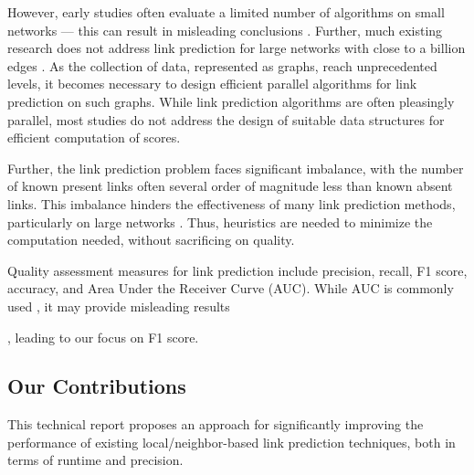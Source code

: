 However, early studies often evaluate a limited number of algorithms on small networks --- this can result in misleading conclusions \cite{zhou2021progresses, zhou2021experimental}. Further, much existing research does not address link prediction for large networks with close to a billion edges \cite{muscoloni2022adaptive, mumin2022efficient, nasiri2021novel, xian2021towards, ghasemian2020stacking, mara2020benchmarking, wang2019link, xu2019distributed, mohan2017scalable, cui2016bounded, garcia2014link, papadimitriou2012fast}. As the collection of data, represented as graphs, reach unprecedented levels, it becomes necessary to design efficient parallel algorithms for link prediction on such graphs. While link prediction algorithms are often pleasingly parallel, most studies do not address the design of suitable data structures for efficient computation of scores.

Further, the link prediction problem faces significant imbalance, with the number of known present links often several order of magnitude less than known absent links. This imbalance hinders the effectiveness of many link prediction methods, particularly on large networks \cite{wang2014link, garcia2014link}. Thus, heuristics are needed to minimize the computation needed, without sacrificing on quality. Quality assessment measures for link prediction include precision, recall, F1 score, accuracy, and Area Under the Receiver Curve (AUC). While AUC is commonly used \cite{arrar2023comprehensive}, it may provide misleading results \cite{yang2015evaluating, lichtnwalter2012link}, leading to our focus on F1 score.





\subsection{Our Contributions}

This technical report proposes an approach for significantly improving the performance of existing local/neighbor-based link prediction techniques, both in terms of runtime and precision.

